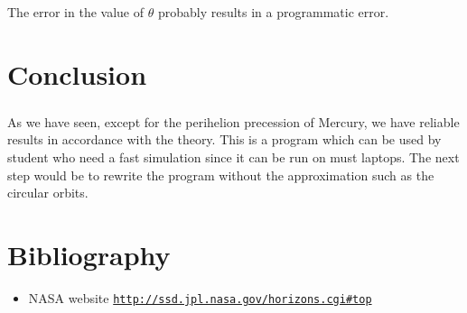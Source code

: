\documentclass[a4paper, twoside, 11pt]{report}
\theoremstyle{theorem}
\theoremstyle{remark}
\theoremstyle{exemple}
\begin{document}
		\paragraph{}The error in the value of $\theta$  probably results in a programmatic error.
    
    

\chapter*{Conclusion}
		\paragraph{}As we have seen, except for the perihelion precession of Mercury, we have reliable results in accordance with the theory. This is a program which can be used by student who need a fast simulation since it can be run on must laptops. The next step would be to rewrite the program without the approximation such as the circular orbits. 

       
        
\chapter*{Bibliography}
    \begin{itemize}
        \item NASA website \href{{http://ssd.jpl.nasa.gov/horizons.cgi#top}}{\nolinkurl{http://ssd.jpl.nasa.gov/horizons.cgi\#top}}
    \end{itemize}
    
    
    
    
    
    
    
    
    
    
\end{document}
